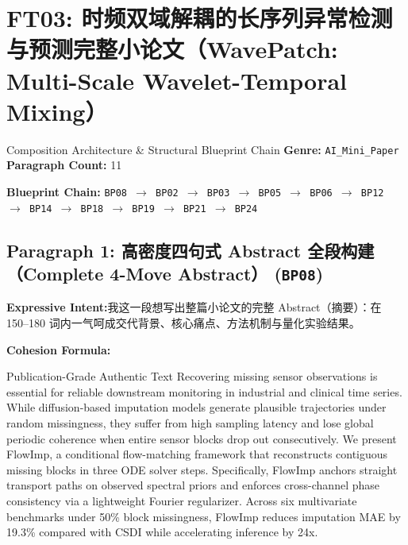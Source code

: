 \section{FT03: 时频双域解耦的长序列异常检测与预测完整小论文（WavePatch: Multi-Scale Wavelet-Temporal Mixing）}\label{comp:FT03}
\begin{ConceptBox}{Composition Architecture \& Structural Blueprint Chain}
\textbf{Genre:} \texttt{AI\_Mini\_Paper} \quad \textbf{Paragraph Count:} 11\par
\textbf{Blueprint Chain:} \texttt{BP08 $\to$ BP02 $\to$ BP03 $\to$ BP05 $\to$ BP06 $\to$ BP12 $\to$ BP14 $\to$ BP18 $\to$ BP19 $\to$ BP21 $\to$ BP24}
\end{ConceptBox}
\subsection*{Paragraph 1: 高密度四句式 Abstract 全段构建（Complete 4-Move Abstract） (\texttt{BP08})}
\noindent\textbf{Expressive Intent:}\enspace 我这一段想写出整篇小论文的完整 Abstract（摘要）：在 150--180 词内一气呵成交代背景、核心痛点、方法机制与量化实验结果。\par
\noindent\textbf{Cohesion Formula:}\par\vspace{4pt}
\begin{ExampleBox}{Publication-Grade Authentic Text}
Recovering missing sensor observations is essential for reliable downstream monitoring in industrial and clinical time series. While diffusion-based imputation models generate plausible trajectories under random missingness, they suffer from high sampling latency and lose global periodic coherence when entire sensor blocks drop out consecutively. We present FlowImp, a conditional flow-matching framework that reconstructs contiguous missing blocks in three ODE solver steps. Specifically, FlowImp anchors straight transport paths on observed spectral priors and enforces cross-channel phase consistency via a lightweight Fourier regularizer. Across six multivariate benchmarks under 50\% block missingness, FlowImp reduces imputation MAE by 19.3\% compared with CSDI while accelerating inference by 24x.
\end{ExampleBox}
